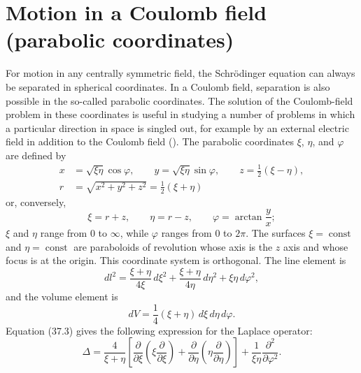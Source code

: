 \section{Motion in a Coulomb field (parabolic coordinates)}

For motion in any centrally symmetric field, the Schrödinger equation can
always be separated in spherical coordinates. In a Coulomb field, separation
is also possible in the so-called parabolic coordinates. The solution of the
Coulomb-field problem in these coordinates is useful in studying a number of
problems in which a particular direction in space is singled out, for example
by an external electric field in addition to the Coulomb field ().
The parabolic coordinates $\xi$, $\eta$, and $\varphi$ are defined by
\begin{equation}
 \begin{aligned}
  x&=\sqrt{\xi\eta}\cos\varphi,\qquad
  y=\sqrt{\xi\eta}\sin\varphi,\qquad
  z=\frac12(\xi-\eta),\\
  r&=\sqrt{x^2+y^2+z^2}=\frac12(\xi+\eta)
 \end{aligned}
 \tag{37.1}
\end{equation}
or, conversely,
\begin{equation}
  \xi=r+z,\qquad \eta=r-z,\qquad
  \varphi=\arctan\frac yx;
  \tag{37.2}
\end{equation}
$\xi$ and $\eta$ range from 0 to $\infty$, while $\varphi$ ranges from 0 to
$2\pi$. The surfaces $\xi=\operatorname{const}$ and
$\eta=\operatorname{const}$ are paraboloids of revolution whose axis is the
$z$ axis and whose focus is at the origin. This coordinate system is
orthogonal. The line element is
\begin{equation}
  dl^2=\frac{\xi+\eta}{4\xi}\,d\xi^2
       +\frac{\xi+\eta}{4\eta}\,d\eta^2
       +\xi\eta\,d\varphi^2,
  \tag{37.3}
\end{equation}
and the volume element is
\begin{equation}
  dV=\frac14(\xi+\eta)\,d\xi\,d\eta\,d\varphi.
  \tag{37.4}
\end{equation}
Equation (37.3) gives the following expression for the Laplace operator:
\begin{equation}
  \Delta=\frac4{\xi+\eta}\left[
    \frac\partial{\partial\xi}\left(\xi\frac\partial{\partial\xi}\right)
   +\frac\partial{\partial\eta}\left(\eta\frac\partial{\partial\eta}\right)
  \right]
  +\frac1{\xi\eta}\frac{\partial^2}{\partial\varphi^2}.
  \tag{37.5}
\end{equation}

